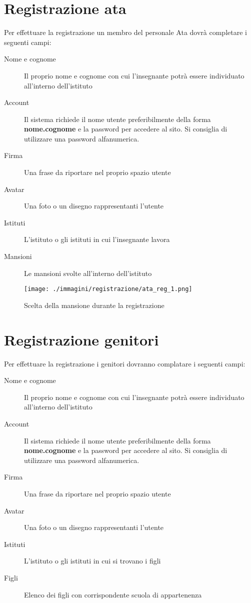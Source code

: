 \section{Registrazione ata}

Per effettuare la registrazione un membro del personale Ata dovrà completare i seguenti campi:

\begin{description}
 \item[Nome e cognome] Il proprio nome e cognome con cui l'insegnante potrà essere individuato all'interno dell'istituto
\item[Account] Il sistema richiede il nome utente preferibilmente della forma \textbf{nome.cognome} e la password per accedere al sito. Si consiglia di utilizzare una password alfanumerica.
\item[Firma] Una frase da riportare nel proprio spazio utente
\item[Avatar] Una foto o un disegno rappresentanti l'utente
\item[Istituti] L'istituto o gli istituti in cui l'insegnante lavora
\item[Mansioni] Le mansioni svolte all'interno dell'istituto
\end{description}


 \begin{figure}[H]
 \centering
 \texttt{[image: ./immagini/registrazione/ata\_reg\_1.png]}
 \caption{Scelta della mansione durante la registrazione}
 \label{fig:reg_ata1}
\end{figure}



\section{Registrazione genitori}

Per effettuare la registrazione i genitori dovranno complatare i seguenti campi:

\begin{description}
 \item[Nome e cognome] Il proprio nome e cognome con cui l'insegnante potrà essere individuato all'interno dell'istituto
\item[Account] Il sistema richiede il nome utente preferibilmente della forma \textbf{nome.cognome} e la password per accedere al sito. Si consiglia di utilizzare una password alfanumerica.
\item[Firma] Una frase da riportare nel proprio spazio utente
\item[Avatar] Una foto o un disegno rappresentanti l'utente
\item[Istituti] L'istituto o gli istituti in cui si trovano i figli
\item[Figli] Elenco dei figli con corrispondente scuola di appartenenza
\end{description}

